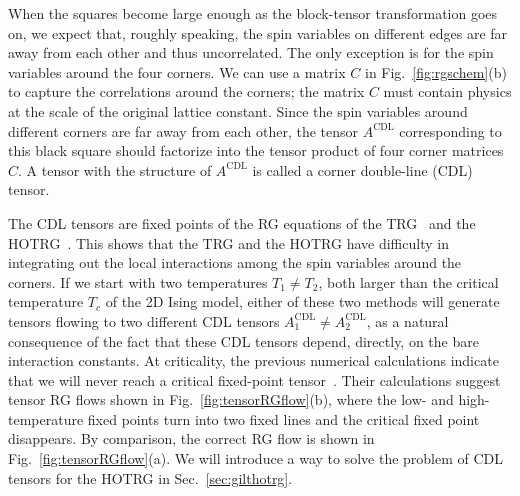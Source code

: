 \documentclass[aps,prr,reprint,superscriptaddress,nofootinbib,floatfix]{revtex4-2}
\begin{document}
When the squares become large enough as the block-tensor transformation goes on, we expect that, roughly speaking, the spin variables on different edges are far away from each other and thus uncorrelated. 
The only exception is for the spin variables around the four corners.
We can use a matrix $C$ in Fig.~\ref{fig:rgschem}(b) to capture the correlations around the corners; the matrix $C$ must contain physics at the scale of the original lattice constant. 
Since the spin variables around different corners are far away from each other, the tensor $A^{\text{CDL}}$ corresponding to this black square should factorize into the tensor product of four corner matrices $C$. 
A tensor with the structure of $A^{\text{CDL}}$ is called a corner double-line (CDL) tensor.
%

The CDL tensors are fixed points of the RG equations of the TRG~\cite{LevinTalk,GuWen2009,tnr,gilts} and the HOTRG~\cite{hotrgfixpoint}.
This shows that the TRG and the HOTRG have difficulty in integrating out the local interactions among the spin variables around the corners. 
If we start with two temperatures $T_1 \neq T_2$, both larger than the critical temperature $T_c$ of the 2D Ising model, either of these two methods will generate tensors flowing to two different CDL tensors $A^{\text{CDL}}_1 \neq A^{\text{CDL}}_2$, as a natural consequence of the fact that these CDL tensors depend, directly, on the bare interaction constants. 
At criticality, the previous numerical calculations indicate that we will never reach a critical fixed-point tensor~\cite{Berker2008,tnr}.
Their calculations suggest tensor RG flows shown in Fig.~\ref{fig:tensorRGflow}(b), where the low- and high-temperature fixed points turn into two fixed lines and the critical fixed point disappears. 
By comparison, the correct RG flow is shown in Fig.~\ref{fig:tensorRGflow}(a).
We will introduce a way to solve the problem of CDL tensors for the HOTRG in Sec.~\ref{sec:gilthotrg}.
\end{document}
